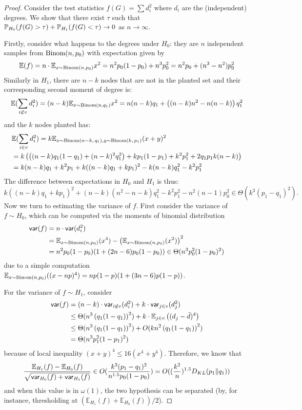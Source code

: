 \documentclass[final,12pt]{colt2023} %
\newcommand\1[1]{\mathbb{I}_{\left\{#1\right\}}}
\begin{document}
\begin{proof}
Consider the test statistics $f(G)=\sum d_i^2$ where $d_i$ are the (independent) degrees. We show that there exist $\tau$ such that $\P_{H_0}(f(G)>\tau)+\P_{H_1}(f(G)<\tau)\to 0$ as $n\to\infty$.

\spac Firstly, consider what happens to the degrees under $H_0$: they are $n$ independent samples from $\Binom(n, p_0)$ with expectation given by
$$\mathbb{E}(f)=n\cdot \mathbb{E}_{x\sim \Binom(n, p_0)}x^2=n^2p_0(1-p_0)+n^3p_0^2=n^2p_0+(n^3-n^2)p_0^2$$
Similarly in $H_1$, there are $n-k$ nodes that are not in the planted set and their corresponding second moment of degree is:
$$\mathbb{E}(\sum_{i\not\in v}d_i^2)=(n-k)\mathbb{E}_{x\sim \Binom(n, q_1)}x^2=n(n-k)q_1+
\left((n-k)n^2-n(n-k)\right)q_1^2$$
and the $k$ nodes planted has:
\begin{align*}
    & \mathbb{E}(\sum_{i\in v}d_i^2)=k\mathbb{E}_{x\sim \Binom(n-k,\, q_1), y\sim \Binom(k,\, p_1)}(x+y)^2\\
    &=k\left(\left((n-k)q_1(1-q_1)+(n-k)^2q_1^2\right)+kp_1(1-p_1)+k^2p_1^2+2q_1p_1k(n-k)\right)\\
    &=k(n-k)q_1+k^2p_1+k((n-k)q_1+kp_1)^2-k(n-k)q_1^2-k^2p_1^2
\end{align*}
The difference between expectations in $H_0$ and $H_1$ is thus:
$$k((n-k)q_1+kp_1)^2+(n-k)(n^2-n-k)q_1^2-k^2p_1^2-n^2(n-1)p_0^2\in \Theta(k^3(p_1-q_1)^2).$$
Now we turn to estimating the variance of $f$. First consider the variance of $f\sim H_0$, which can be computed via the moments of binomial distribution\begin{align*}
    \var(f)&=n\cdot \var(d_i^2)\\
    &=\mathbb{E}_{x\sim \Binom(n, p_0)}(x^4)-\left(\mathbb{E}_{x\sim \Binom(n, p_0)}(x^2)\right)^2 \\
    &=n^2p_0(1-p_0)(1+(2n-6)p_0(1-p_0))\in\Theta(n^3p_0^2(1-p_0)^2)
\end{align*}
due to a simple computation $\mathbb{E}_{x\sim \Binom(n, p_0)}((x-np)^4)=np(1-p)(1+(3n-6)p(1-p))$.

\spac
For the variance of $f\sim H_1$, consider
\begin{align*}
    \var(f)&=(n-k)\cdot \var_{i\not\in v}(d_i^2)+k\cdot\var_{j\in v} (d_j^2)\\
    &\leq \Theta(n^3\left(q_1(1-q_1)\right)^2)+ k\cdot\mathbb{E}_{j\in v} \left((d_j-\bar d)^4\right)\\
    &\leq \Theta(n^3\left(q_1(1-q_1)\right)^2)+O(kn^2\left(q_1(1-q_1)\right)^2)\\
    &= \Theta (n^3p_1^2(1-p_1)^2)
\end{align*}
because of local inequality $(x+y)^4\leq 16(x^4+y^4)$.
Therefore, we know that $$\frac{\mathbb{E}_{H_1}(f)-\mathbb{E}_{H_0}(f)}{\sqrt{\var_{H_0}(f)+\var_{H_1}(f)}}\in O(\frac{k^3(p_1-q_1)^2}{n^{1.5}p_0(1-p_0)})=O((\frac{k^2}{n})^{1.5}D_{KL}(p_1\|q_1))$$and when this value is in $\omega(1)$, the two hypothesis can be separated (by, for instance, thresholding at $(\mathbb{E}_{H_1}(f)+\mathbb{E}_{H_0}(f))/2$).
\end{proof}
\end{document}
